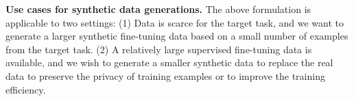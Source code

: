 \textbf{Use cases for synthetic data generations.} The above formulation is applicable to two settings: (1) Data is scarce for the target task, and we want to generate a larger synthetic fine-tuning data based on a small number of examples from the target task.
(2) A relatively large supervised fine-tuning data is available, and we wish to generate a smaller synthetic data to replace the real data to preserve the privacy of training examples or to improve the training efficiency.

%
%

